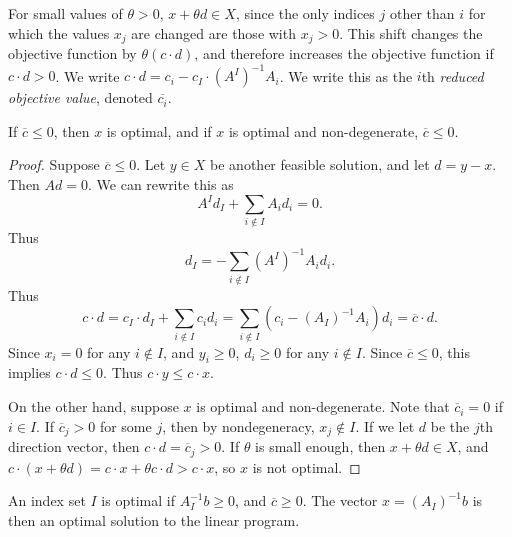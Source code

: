 For small values of $\theta > 0$, $x + \theta d \in X$, since the only indices $j$ other than $i$ for which the values $x_j$ are changed are those with $x_j > 0$. This shift changes the objective function by $\theta (c \cdot d)$, and therefore increases the objective function if $c \cdot d > 0$. We write $c \cdot d = c_i - c_I \cdot (A^I)^{-1} A_i$. We write this as the $i$th \emph{reduced objective value}, denoted $\overline{c_i}$.

\begin{lemma}
    If $\overline{c} \leq 0$, then $x$ is optimal, and if $x$ is optimal and non-degenerate, $\overline{c} \leq 0$.
\end{lemma}
\begin{proof}
    Suppose $\overline{c} \leq 0$. Let $y \in X$ be another feasible solution, and let $d = y - x$. Then $Ad = 0$. We can rewrite this as
    \[ A^I d_I + \sum_{i \not \in I} A_id_i = 0. \]
    Thus
    \[ d_I = - \sum_{i \not \in I} (A^I)^{-1} A_i d_i. \]
    Thus
    \[ c \cdot d = c_I \cdot d_I + \sum_{i \not \in I} c_i d_i = \sum_{i \not \in I} (c_i - (A_I)^{-1} A_i) d_i = \overline{c} \cdot d. \]
    Since $x_i = 0$ for any $i \not \in I$, and $y_i \geq 0$, $d_i \geq 0$ for any $i \not \in I$. Since $\overline{c} \leq 0$, this implies $c \cdot d \leq 0$. Thus $c \cdot y \leq c \cdot x$.

    On the other hand, suppose $x$ is optimal and non-degenerate. Note that $\overline{c}_i = 0$ if $i \in I$. If $\overline{c}_j > 0$ for some $j$, then by nondegeneracy, $x_j \not \in I$. If we let $d$ be the $j$th direction vector, then $c \cdot d = \overline{c}_j > 0$. If $\theta$ is small enough, then $x + \theta d \in X$, and $c \cdot (x + \theta d) = c \cdot x + \theta c \cdot d > c \cdot x$, so $x$ is not optimal.
\end{proof}

An index set $I$ is optimal if $A_I^{-1}b \geq 0$, and $\overline{c} \geq 0$. The vector $x = (A_I)^{-1}b$ is then an optimal solution to the linear program.

